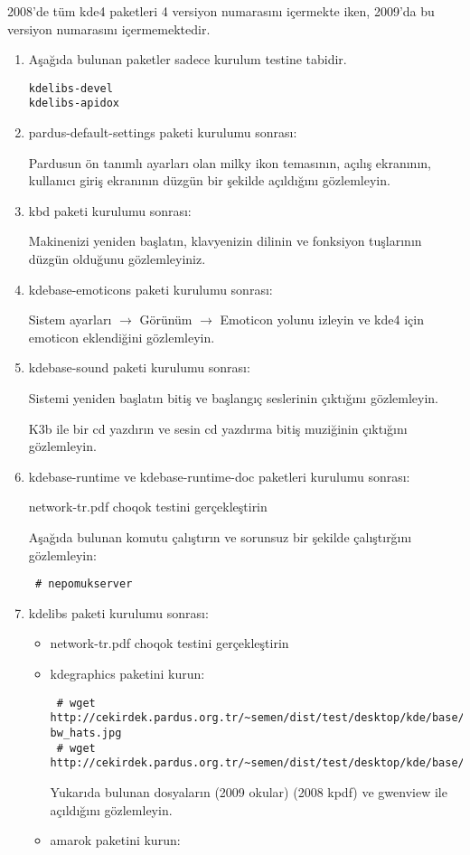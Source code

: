 \documentclass[a4paper,10pt]{article}
\begin{document}
2008'de tüm kde4 paketleri 4 versiyon numarasını içermekte iken, 2009'da bu versiyon numarasını içermemektedir.
\begin{enumerate} 
\item  Aşağıda bulunan paketler sadece kurulum testine tabidir.
\begin{verbatim}
kdelibs-devel
kdelibs-apidox 
\end{verbatim}
\item pardus-default-settings paketi kurulumu sonrası:

Pardusun ön tanımlı ayarları olan milky ikon temasının, açılış ekranının, kullanıcı giriş ekranının düzgün bir şekilde açıldığını gözlemleyin.

\item kbd paketi kurulumu sonrası:

Makinenizi yeniden başlatın, klavyenizin dilinin ve fonksiyon tuşlarının düzgün olduğunu gözlemleyiniz. 
\item kdebase-emoticons paketi kurulumu sonrası:

Sistem ayarları $\rightarrow$ Görünüm $\rightarrow$ Emoticon yolunu izleyin ve kde4 için emoticon eklendiğini gözlemleyin.
\item kdebase-sound paketi kurulumu sonrası:

Sistemi yeniden başlatın bitiş ve başlangıç seslerinin çıktığını gözlemleyin.

K3b ile bir cd yazdırın ve sesin cd yazdırma bitiş muziğinin çıktığını gözlemleyin.
\item kdebase-runtime ve kdebase-runtime-doc paketleri kurulumu sonrası:

network-tr.pdf choqok testini gerçekleştirin

Aşağıda bulunan komutu çalıştırın ve sorunsuz bir şekilde çalıştırğını gözlemleyin:
\begin{verbatim}
 # nepomukserver
\end{verbatim}

 \item kdelibs paketi kurulumu sonrası:
\begin{itemize}
 \item network-tr.pdf choqok testini gerçekleştirin


 \item kdegraphics paketini kurun:
\begin{verbatim}	
 # wget http://cekirdek.pardus.org.tr/~semen/dist/test/desktop/kde/base/circus-bw_hats.jpg
 # wget http://cekirdek.pardus.org.tr/~semen/dist/test/desktop/kde/base/tepecik_01.png
\end{verbatim}
Yukarıda bulunan dosyaların (2009 okular) (2008 kpdf) ve gwenview ile açıldığını gözlemleyin.
\item amarok paketini kurun:


\end{itemize}
\end{enumerate}
\end{document}
